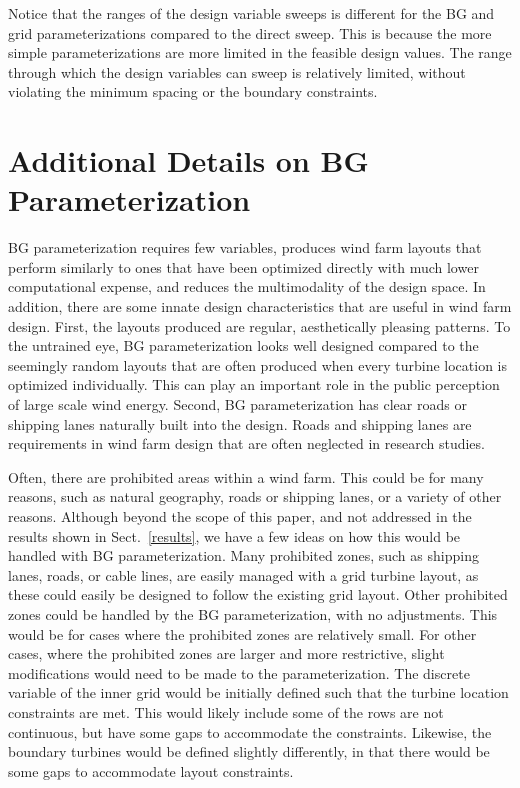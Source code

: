 \documentclass[wes, manuscript]{copernicus}
\begin{document}
Notice that the ranges of the design variable sweeps is different for the BG and grid parameterizations compared to the direct sweep. This is because the more simple parameterizations are more limited in the feasible design values. The range through which the design variables can sweep is relatively limited, without violating the minimum spacing or the boundary constraints. 

\newpage
\section{Additional Details on BG Parameterization}

BG parameterization requires few variables, produces wind farm layouts that perform similarly to ones that have been optimized directly with much lower computational expense, and reduces the multimodality of the design space. In addition, there are some innate design characteristics that are useful in wind farm design. First, the layouts produced are regular, aesthetically pleasing patterns. To the untrained eye, BG parameterization looks well designed compared to the seemingly random layouts that are often produced when every turbine location is optimized individually. This can play an important role in the public perception of large scale wind energy. Second, BG parameterization has clear roads or shipping lanes naturally built into the design. Roads and shipping lanes are requirements in wind farm design that are often neglected in research studies. %

Often, there are prohibited areas within a wind farm. This could be for many reasons, such as natural geography, roads or shipping lanes, or a variety of other reasons. Although beyond the scope of this paper, and not addressed in the results shown in Sect.~\ref{results}, we have a few ideas on how this would be handled with BG parameterization.
%
Many prohibited zones, such as shipping lanes, roads, or cable lines, are easily managed with a grid turbine layout, as these could easily be designed to follow the existing grid layout. Other prohibited zones could be handled by the BG parameterization, with no adjustments. This would be for cases where the prohibited zones are relatively small. For other cases, where the prohibited zones are larger and more restrictive, slight modifications would need to be made to the parameterization. The discrete variable of the inner grid would be initially defined such that the turbine location constraints are met. This would likely include some of the rows are not continuous, but have some gaps to accommodate the constraints. Likewise, the boundary turbines would be defined slightly differently, in that there would be some gaps to accommodate layout constraints. 
\end{document}
